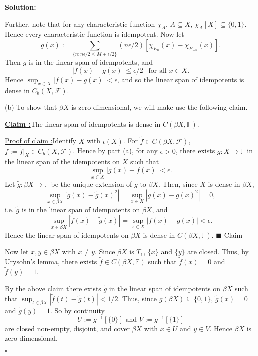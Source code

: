 \documentclass[12pt]{article}
\newcounter{ProofCounter}
\newcounter{ClaimCounter}[ProofCounter]
\newenvironment{Solution}{\stepcounter{ProofCounter}\textbf{Solution:}}{\hfill$\square$}
\newenvironment{claim}[1]{\vspace{1mm}\stepcounter{ClaimCounter}\par\noindent\underline{\bf Claim \theClaimCounter:}\space#1}{}
\newenvironment{claimproof}[1]{\par\noindent\underline{Proof of claim \theClaimCounter:}\space#1}{\hfill $\blacksquare$ Claim \theClaimCounter}
\begin{document}
\begin{Solution}
\begin{enumerate}
      Further, note that for any characteristic function $\chi_A$, $A \subseteq X$, $\chi_A[X] \subseteq
      \{0,1\}$. Hence every characteristic function is idempotent. Now let 
      \[
        g(x) := \sum_{\{n : n\epsilon / 2 \leq M + \epsilon / 2\}} (n\epsilon / 2)[ \chi_{E_n}(x) - \chi_{E_{-n}}(x)].
      \]
      Then $g$ is in the linear span of idempotents, and 
      \[
        |f(x) - g(x)| \leq \epsilon / 2 \ \ \text{ for all } x \in X.
      \]
      Hence $\sup_{x \in X}|f(x) - g(x)| < \epsilon$, and so the linear span of idempotents is dense in $C_b(X, \mathcal{F})$.

      (b) To show that $\beta X$ is zero-dimensional, we will make use the following claim.
      \begin{claim}
        The linear span of idempotents is dense in $C(\beta X, \mathbb{F})$.
      \end{claim}
      \begin{claimproof}
        Identify $X$ with $\iota(X)$.
        For $\tilde{f} \in C(\beta X, \mathcal{F})$, $f := \tilde{f}\big|_{X} \in C_b(X, \mathcal{F})$. Hence by part (a), for any $\epsilon > 0$, 
        there exists $g : X \rightarrow \mathbb{F}$ in the linear span of the idempotents on $X$ such that
        \[
          \sup_{x \in X}|g(x) - f(x)| < \epsilon.
        \]
        Let $\tilde{g} : \beta X \rightarrow \mathbb{F}$ be the unique extension of $g$ to $\beta X$. Then, since $X$ is dense in $\beta X$,
        \[
          \sup_{x \in \beta X}|\tilde{g}(x) - \tilde{g}(x)^2| = \sup_{x \in X}|g(x) - g(x)^2| = 0,
        \]
        i.e. $\tilde{g}$ is in the linear span of idempotents on $\beta X$, and
        \[
          \sup_{x \in \beta X}|\tilde{f}(x) - \tilde{g}(x)| = \sup_{x \in X}|f(x) - g(x)| < \epsilon.
        \]
        Hence the linear span of idempotents on $\beta X$ is dense in $C(\beta X, \mathbb{F})$.
      \end{claimproof}

      Now let $x, y \in \beta X$ with $x \neq y$. Since $\beta X$ is $T_1$, $\{x\}$ and $\{y\}$ are closed. Thus, by Urysohn's lemma, there exists
      $\tilde{f}
      \in C(\beta X, \mathbb{F})$ such that $\tilde{f}(x) = 0$ and $\tilde{f}(y) = 1$. 
      
      By the above claim there exists $\tilde{g}$ in the linear span of idempotents on
      $\beta X$ such that $\sup_{t \in \beta X}|\tilde{f}(t) - \tilde{g}(t)| < 1/2$. Thus, since $g(\beta X) \subseteq \{0,1\}$,
      $\tilde{g}(x) = 0$ and $\tilde{g}(y) = 1$. So by continuity
      \[
        U := g^{-1}[\{0\}] \text{ and } V := g^{-1}[\{1\}]
      \]
      are closed non-empty, disjoint, and cover $\beta X$ with $x \in U$ and $y \in V$. Hence $\beta X$ is
      zero-dimensional.

  \end{enumerate}
\end{Solution}
\end{document}
